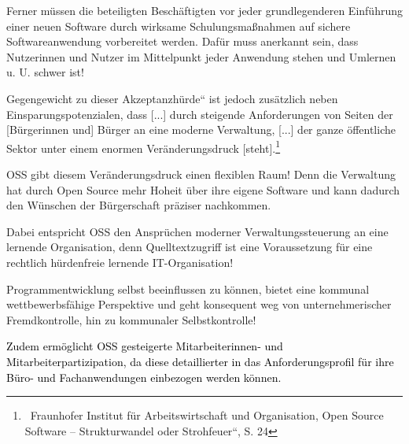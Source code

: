 \documentclass[a4paper]{article}
\begin{document}
{\color{black}
Ferner m\"ussen die beteiligten Besch\"aftigten vor jeder
grundlegenderen Einf\"uhrung einer neuen Software durch wirksame
Schulungsma{\ss}nahmen auf sichere Softwareanwendung vorbereitet
werden. Daf\"ur muss anerkannt sein, dass Nutzerinnen und Nutzer im
Mittelpunkt jeder Anwendung stehen und Umlernen u. U. schwer ist!}


\bigskip

{
Gegengewicht zu dieser
{\quotedblbase}Akzeptanzh\"urde{\textquotedblleft} ist jedoch
zus\"atzlich neben Einsparungspotenzialen, dass {\guillemotright} [...]
durch steigende Anforderungen von Seiten der [B\"urgerinnen und]
B\"urger an eine moderne Verwaltung, [...] der ganze \"offentliche
Sektor unter einem enormen Ver\"anderungsdruck
[steht].{\guillemotleft}\footnote{\ Fraunhofer Institut f\"ur
Arbeitswirtschaft und Organisation, {\quotedblbase}Open Source Software
-- Strukturwandel oder Strohfeuer{\textquotedblleft}, S. 24}}

{
OSS gibt diesem Ver\"anderungsdruck einen flexiblen Raum! Denn die
Verwaltung hat durch Open Source mehr Hoheit \"uber ihre eigene
Software und kann dadurch den W\"unschen der B\"urgerschaft pr\"aziser
nachkommen.}

{\color{black}
Dabei entspricht OSS den Anspr\"uchen moderner Verwaltungssteuerung an
eine lernende Organisation, denn Quelltextzugriff ist eine
Voraussetzung f\"ur eine rechtlich h\"urdenfreie lernende
IT-Organisation!}

{\color{black}
Programmentwicklung selbst beeinflussen zu k\"onnen, bietet eine
kommunal wettbewerbsf\"ahige Perspektive und geht konsequent weg von
unternehmerischer Fremdkontrolle, hin zu kommunaler Selbstkontrolle!}

{
\textcolor{black}{Zudem erm\"oglicht OSS gesteigerte Mitarbeiterinnen-
und Mitarbeiterpartizipation, da diese detaillierter in das
Anforderungsprofil f\"ur ihre B\"uro- und Fachanwendungen einbezogen
werden k\"onnen.}}


\bigskip
\end{document}
